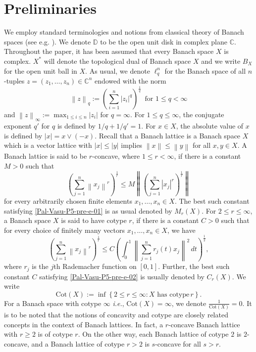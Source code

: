 \documentclass[a4paper,12pt]{amsart}
\theoremstyle{definition}
\newcommand{\norm}[1]{\left\lVert#1\right\rVert}
\begin{document}
\section{Preliminaries}
We employ standard terminologies and notions from classical theory of Banach spaces (see e.g. \cite{lindenstrauss-book-I,lindenstrauss-book-II}). We denote $\mathbb{D}$ to be the open unit disk in complex plane $\mathbb{C}$. Throughout the paper, it has been assumed that every Banach space $X$ is complex. $X^*$ will denote the topological dual of Banach space $X$ and we write $B_{X}$ for the open unit ball in $X$. As usual, we denote $\ell^n_q$ for the Banach space of all $n$-tuples $z=(z_1, \ldots, z_n)\in \mathbb{C}^n$ endowed with the norm 
\begin{equation*}
	\norm{z}_q:= \left(\sum_{i=1}^{n}|z_i|^q\right)^{\frac{1}{q}}\,\,\, \mbox{for} \,\, 1\leq q<\infty
\end{equation*}
and $\norm{z}_{\infty}:= \max_{1\leq i\leq n}|z_i|$ for $q=\infty$. For $1\leq q\leq \infty$, the conjugate exponent $q'$ for $q$ is defined by $1/q+1/q'=1$. For $x\in X$, the absolute value of $x$ is defined by $|x|=x\vee (-x)$. Recall that a Banach lattice is a Banach space $X$ which is a vector lattice with $|x|\leq |y|$ implies $\norm{x}\leq \norm{y}$ for all $x,y\in X$. A Banach lattice is said to be $r$-concave, where $1\leq r<\infty$, if there is a constant $M>0$ such that 
\begin{equation}\label{Pal-Vasu-P5-pre-e-01}
	\left(\sum_{j=1}^{n}\norm{x_j}^r\right)^{\frac{1}{r}}\leq M \norm{\left(\sum_{j=1}^{n}|x_j|^r\right)^{\frac{1}{r}}}
\end{equation} 
for every arbitrarily chosen finite elements $x_1,\ldots, x_n\in X$. The best such constant satisfying \eqref{Pal-Vasu-P5-pre-e-01} is as usual denoted by $M_r(X)$. For $2\leq r\leq \infty$, a Banach space $X$ is said to have cotype $r$, if there is a constant $C>0$ such that for every choice of finitely many vectors $x_1, \ldots, x_n\in X$, we have
\begin{equation}\label{Pal-Vasu-P5-pre-e-02}
	\left(\sum_{j=1}^{n}\norm{x_j}^r\right)^{\frac{1}{r}} \leq C \left(\int_{0}^{1}\norm{\sum_{j=1}^{n}r_j(t)x_j}^2\, dt\right)^{\frac{1}{2}},
\end{equation}
where $r_j$ is the $j$th Rademacher function on $[0,1]$. Further, the best such constant $C$ satisfying \eqref{Pal-Vasu-P5-pre-e-02} is usually denoted by $C_r(X)$. We write 
\begin{equation*}
	\text{Cot}(X):= \inf \left\{2\leq r\leq \infty: X \,\, \mbox{has cotype}\, r\right\}.
\end{equation*}
For a Banach space with cotype $\infty$ {\it i.e.}, $\text{Cot}(X)=\infty$, we denote $\frac{1}{\text{Cot}(X)}=0$. It is to be noted that the notions of concavity and cotype are closely related concepts in the context of Banach lattices. In fact, a $r$-concave Banach lattice with $r\geq 2$ is of cotype $r$. On the other way, each Banach lattice of cotype $2$ is $2$-concave, and a Banach lattice of cotype $r>2$ is $s$-concave for all $s>r$.\\[1mm]
\end{document}
